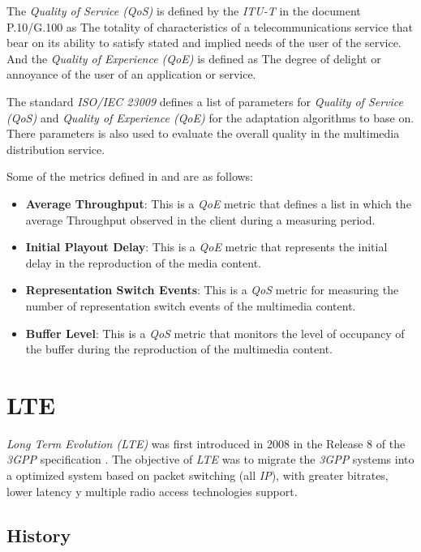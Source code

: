 The \textit{Quality of Service (QoS)} is defined by the \textit{ITU-T} in the document P.10/G.100
 \cite{itu2} as \textquotedbl The totality of characteristics of a telecommunications service that bear on its 
 ability to satisfy stated and implied needs of the user of the service\textquotedbl. And the \textit{Quality of 
Experience (QoE)} is defined as \textquotedbl The degree of delight or annoyance of the user of an application or service\textquotedbl.

The standard \textit{ISO/IEC 23009} defines a list of parameters for \textit{Quality of Service (QoS)} and
\textit{Quality of Experience (QoE)} for the adaptation algorithms to base on. There parameters 
is also used to evaluate the overall quality in the multimedia distribution service.

Some of the metrics defined in \cite{3gpp1} and \cite{ISO23009} are as follows:

\begin{itemize}
  \item \textbf{Average Throughput}: This is a \textit{QoE} metric that defines a list in which 
  the average Throughput observed in the client during a measuring period.
  \item \textbf{Initial Playout Delay}: This is a \textit{QoE} metric that represents the initial 
  delay in the reproduction of the media content.
  \item \textbf{Representation Switch Events}: This is a \textit{QoS} metric for measuring the 
  number of representation switch events of the multimedia content.
  \item \textbf{Buffer Level}: This is a \textit{QoS} metric that monitors the level of occupancy
  of the buffer during the reproduction of the multimedia content.
\end{itemize}


\section{LTE}
\label{sec:4g}

\textit{Long Term Evolution (LTE)} was first introduced in 2008 in the Release 8 of the \textit{3GPP}
specification \cite{lte1}. The objective of \textit{LTE} was to migrate the \textit{3GPP} systems
into a optimized system based on packet switching (all \textit{IP}), with greater bitrates, lower
latency y multiple radio access technologies support.

\subsection{History}
\label{sec:4gintro}

